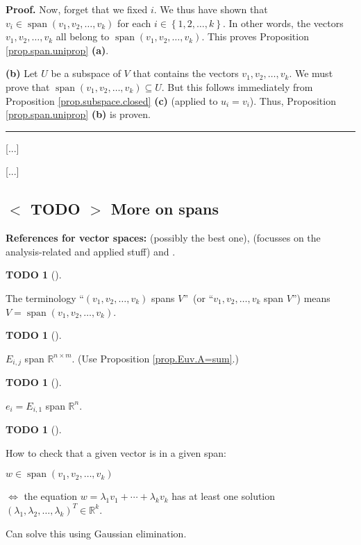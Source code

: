 \documentclass[numbers=enddot,12pt,final,onecolumn,notitlepage]{scrartcl}%
\theoremstyle{definition}
\newtheorem{quest}[theo]{TODO}
\newenvironment{todo}[1][]
{\begin{quest}[#1]\begin{leftbar}}
{\end{leftbar}\end{quest}}
\newenvironment{proof}[1][Proof]{\noindent\textbf{#1.} }{\ \rule{0.5em}{0.5em}}
\begin{document}
\begin{proof}
Now, forget that we fixed $i$. We thus have shown that $v_{i}\in
\operatorname{span}\left(  v_{1},v_{2},\ldots,v_{k}\right)  $ for each
$i\in\left\{  1,2,\ldots,k\right\}  $. In other words, the vectors
$v_{1},v_{2},\ldots,v_{k}$ all belong to $\operatorname{span}\left(
v_{1},v_{2},\ldots,v_{k}\right)  $. This proves Proposition
\ref{prop.span.uniprop} \textbf{(a)}.

\textbf{(b)} Let $U$ be a subspace of $V$ that contains the vectors
$v_{1},v_{2},\ldots,v_{k}$. We must prove that $\operatorname{span}\left(
v_{1},v_{2},\ldots,v_{k}\right)  \subseteq U$. But this follows immediately
from Proposition \ref{prop.subspace.closed} \textbf{(c)} (applied to
$u_{i}=v_{i}$). Thus, Proposition \ref{prop.span.uniprop} \textbf{(b)} is proven.
\end{proof}

[...]

[...]

\subsection{%
$<$%
TODO%
$>$
More on spans}

\textbf{References for vector spaces:} \cite[\S 5.1]{LaNaSc16} (possibly the
best one), \cite[\S 2.3]{OlvSha06} (focusses on the analysis-related and
applied stuff) and \cite[Two.I.2]{Heffer16}.

\begin{todo}
The terminology \textquotedblleft$\left(  v_{1},v_{2},\ldots,v_{k}\right)  $
spans $V$\textquotedblright\ (or \textquotedblleft$v_{1},v_{2},\ldots,v_{k}$
span $V$\textquotedblright) means $V=\operatorname{span}\left(  v_{1}%
,v_{2},\ldots,v_{k}\right)  $.
\end{todo}

\begin{todo}
$E_{i,j}$ span $\mathbb{R}^{n\times m}$. (Use Proposition \ref{prop.Euv.A=sum}.)
\end{todo}

\begin{todo}
$e_{i} = E_{i,1}$ span $\mathbb{R}^{n}$.
\end{todo}

\begin{todo}
How to check that a given vector is in a given span:

$w\in\operatorname{span}\left(  v_{1},v_{2},\ldots,v_{k}\right)  $

$\Longleftrightarrow$ the equation $w=\lambda_{1}v_{1}+\cdots+\lambda_{k}%
v_{k}$ has at least one solution $\left(  \lambda_{1},\lambda_{2}%
,\ldots,\lambda_{k}\right)  ^{T}\in\mathbb{R}^{k}$.

Can solve this using Gaussian elimination.
\end{todo}
\end{document}
